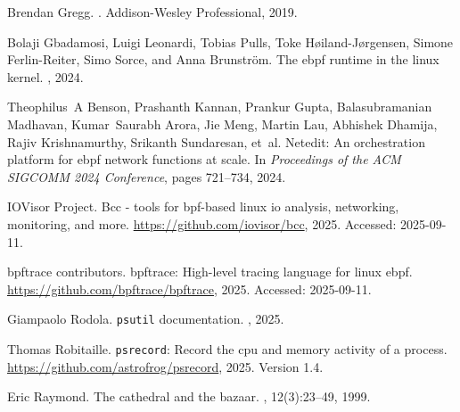 \documentclass[10pt]{article}
\newcommand{\beginsupplement}{%
        \setcounter{table}{0}
        \renewcommand{\thetable}{S\arabic{table}}%
        \setcounter{figure}{0}
        \renewcommand{\thefigure}{S\arabic{figure}}%
        \setcounter{section}{0}
        \renewcommand{\thesection}{S\arabic{section}}%
      }
\begin{document}
\begin{thebibliography}{1}

Brendan Gregg.
.
\newblock Addison-Wesley Professional, 2019.

Bolaji Gbadamosi, Luigi Leonardi, Tobias Pulls, Toke H{\o}iland-J{\o}rgensen,
  Simone Ferlin-Reiter, Simo Sorce, and Anna Brunstr{\"o}m.
\newblock The ebpf runtime in the linux kernel.
, 2024.

Theophilus~A Benson, Prashanth Kannan, Prankur Gupta, Balasubramanian Madhavan,
  Kumar~Saurabh Arora, Jie Meng, Martin Lau, Abhishek Dhamija, Rajiv
  Krishnamurthy, Srikanth Sundaresan, et~al.
\newblock Netedit: An orchestration platform for ebpf network functions at
  scale.
\newblock In {\em Proceedings of the ACM SIGCOMM 2024 Conference}, pages
  721--734, 2024.

IOVisor Project.
\newblock Bcc - tools for bpf-based linux io analysis, networking, monitoring,
  and more.
\newblock \url{https://github.com/iovisor/bcc}, 2025.
\newblock Accessed: 2025-09-11.

bpftrace contributors.
\newblock bpftrace: High-level tracing language for linux ebpf.
\newblock \url{https://github.com/bpftrace/bpftrace}, 2025.
\newblock Accessed: 2025-09-11.

Giampaolo Rodola.
\newblock \texttt{psutil} documentation.
, 2025.

Thomas Robitaille.
\newblock \texttt{psrecord}: Record the cpu and memory activity of a process.
\newblock \url{https://github.com/astrofrog/psrecord}, 2025.
\newblock Version 1.4.

Eric Raymond.
\newblock The cathedral and the bazaar.
, 12(3):23--49, 1999.

\end{thebibliography}

\clearpage


\end{document}
